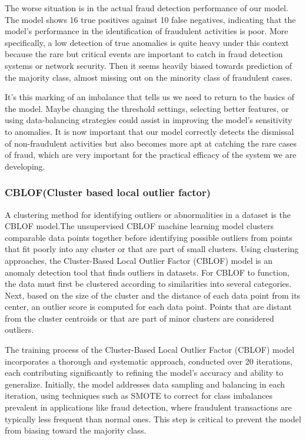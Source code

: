 \documentclass[journal]{IEEEtran}
\begin{document}
The worse situation is in the actual fraud detection performance of our model. The model shows 16 true positives against 10 false negatives, indicating that the model's performance in the identification of fraudulent activities is poor. More specifically, a low detection of true anomalies is quite heavy under this context because the rare but critical events are important to catch in fraud detection systems or network security. Then it seems heavily biased towards prediction of the majority class, almost missing out on the minority class of fraudulent cases.

It's this marking of an imbalance that tells us we need to return to the basics of the model. Maybe changing the threshold settings, selecting better features, or using data-balancing strategies could assist in improving the model's sensitivity to anomalies. It is now important that our model correctly detects the dismissal of non-fraudulent activities but also becomes more apt at catching the rare cases of fraud, which are very important for the practical efficacy of the system we are developing.


\subsubsection{{CBLOF(Cluster based local outlier factor)}}

A clustering method for identifying outliers or abnormalities in a dataset is the CBLOF model.The unsupervised CBLOF machine learning model clusters comparable data points together before identifying possible outliers from points that fit poorly into any cluster or that are part of small clusters. Using clustering approaches, the Cluster-Based Local Outlier Factor (CBLOF) model is an anomaly detection tool that finds outliers in datasets. For CBLOF to function, the data must first be clustered according to similarities into several categories. Next, based on the size of the cluster and the distance of each data point from its center, an outlier score is computed for each data point. Points that are distant from the cluster centroids or that are part of minor clusters are considered outliers.

The training process of the Cluster-Based Local Outlier Factor (CBLOF) model incorporates a thorough and systematic approach, conducted over 20 iterations, each contributing significantly to refining the model’s accuracy and ability to generalize. Initially, the model addresses data sampling and balancing in each iteration, using techniques such as SMOTE to correct for class imbalances prevalent in applications like fraud detection, where fraudulent transactions are typically less frequent than normal ones. This step is critical to prevent the model from biasing toward the majority class.
\end{document}
